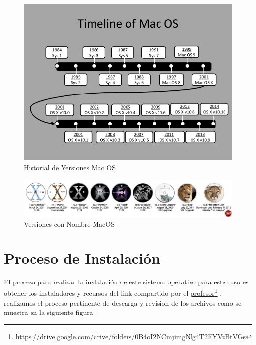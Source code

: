 \documentclass[paper=a4, fontsize=12pt]{article} 		%
\newcommand\fnurl[2]{%
\href{#2}{#1}\footnote{\url{#2}}%
}
\numberwithin{equation}{section}						%
\numberwithin{table}{section} 							%
\begin{document}
\begin{center}
\begin{figure}[H]
\includegraphics[scale=0.6]{img/mactl.jpg}
\caption{Historial de Versiones Mac OS}
\label{fig:dis2}
\end{figure}
\end{center}

\begin{center}
\begin{figure}[H]
\includegraphics[scale=0.4]{img/tl.jpg}
\caption{Versiones con Nombre MacOS}
\label{fig:dis2}
\end{figure}
\end{center}
\section{Proceso de Instalación}
El proceso para realizar la instalación de este sistema operativo  para este caso es obtener los instaladores y recursos del link compartido por el \fnurl{profesor}{https://drive.google.com/drive/folders/0B4oI2NCmjimgNlg4T2FYVzBtVGs}, realizamos el proceso pertinente de descarga y revision de los archivos como se muestra en la siguiente figura : 
\end{document}
